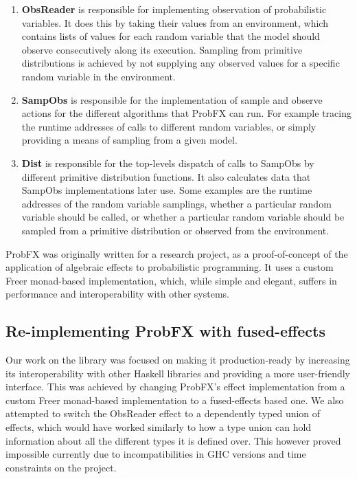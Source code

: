 \documentclass[conference]{IEEEtran}
\begin{document}
\begin{enumerate}
    \item \textbf{ObsReader} is responsible for implementing observation of probabilistic variables. It does this by taking their values from an environment, which contains lists of values for each random variable that the model should observe consecutively along its execution. Sampling from primitive distributions is achieved by not supplying any observed values for a specific random variable in the environment.
    \item \textbf{SampObs} is responsible for the implementation of sample and observe actions for the different algorithms that ProbFX can run. For example tracing the runtime addresses of calls to different random variables, or simply providing a means of sampling from a given model.
    \item \textbf{Dist} is responsible for the top-levels dispatch of calls to SampObs by different primitive distribution functions. It also calculates data that SampObs implementations later use. Some examples are
    the runtime addresses of the random variable samplings, whether a particular random variable should be called, or whether a particular random variable should be sampled from a primitive distribution or observed from the environment.
\end{enumerate}

ProbFX was originally written for a research project, as a proof-of-concept of the application of algebraic effects to probabilistic programming. It uses a custom Freer monad-based implementation, which, while simple and elegant, suffers in performance and interoperability with other systems.

\subsection*{Re-implementing ProbFX with fused-effects}

Our work on the library was focused on making it production-ready by increasing its interoperability with other Haskell libraries and providing a more user-friendly interface. This was achieved by changing ProbFX's effect implementation from a custom Freer monad-based implementation to a fused-effects based one. We also attempted to switch the ObsReader effect to a dependently typed union of effects, which would have worked similarly to how a type union \cite{higherrinductivetypes} can hold information about all the different types it is defined over. This however proved impossible currently due to incompatibilities in GHC versions and time constraints on the project.
\end{document}
